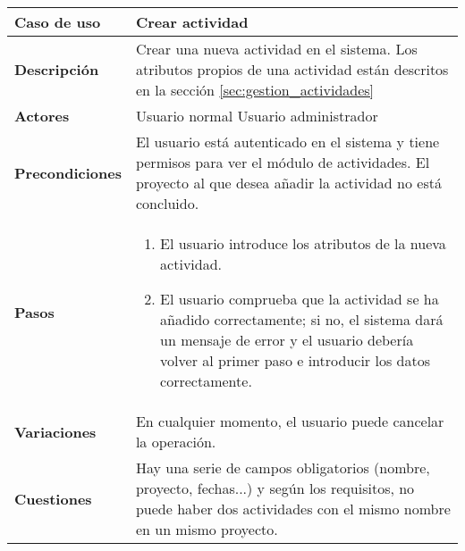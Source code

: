 \begin{tabular}{|p{1.25in}|p{3.65in}|}\hline
\textbf{Caso de uso} & \textbf{Crear actividad}\\\hline\hline
\textbf{Descripción} & Crear una nueva actividad en el sistema. Los
atributos propios de una actividad están descritos en la sección
\ref{sec:gestion_actividades}\\\hline
\textbf{Actores} & Usuario normal \newline Usuario administrador\\\hline
\textbf{Precondiciones} & El usuario está autenticado en el sistema y
tiene permisos para ver el módulo de actividades. El proyecto al que desea
añadir la actividad no está concluido. \\\hline
\textbf{Pasos} &
  \begin{enumerate}
   \item El usuario introduce los atributos de la nueva actividad.
   \item El usuario comprueba que la actividad se ha añadido correctamente; si
no, el sistema dará un mensaje de error y el usuario debería volver al primer
paso e introducir los datos correctamente.
  \end{enumerate}
\\\hline
\textbf{Variaciones} & En cualquier momento, el usuario puede cancelar
la operación.\\\hline
\textbf{Cuestiones} & Hay una serie de campos obligatorios (nombre,
proyecto, fechas...) y según los requisitos, no puede haber dos actividades
con el mismo nombre en un mismo proyecto.\\\hline
\end{tabular}

